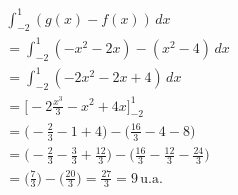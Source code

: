\begin{exercicio}
\begin{align*}
  &\int_{-2}^{1}(g(x)-f(x))\, dx\\
  &=\int_{-2}^{1}(-x^2-2x)-(x^2-4)\, dx\\
  &=\int_{-2}^{1}(-2x^2-2x+4)\, dx\\
  &=\Big[-2\frac{x^3}{3}-x^2+4x\Big]_{-2}^1\\
  &=\Big(-\frac{2}{3}-1+4\Big)-\Big(\frac{16}{3}-4-8\Big)\\
  &=\Big(-\frac{2}{3}-\frac{3}{3}+\frac{12}{3}\Big)-\Big(\frac{16}{3}-\frac{12}{3}-\frac{24}{3}\Big)\\
  &=\Big(\frac{7}{3}\Big)-\Big(\frac{20}{3}\Big)=\frac{27}{3}=\boxed{9\,\text{u.a.}}\\
\end{align*}
\end{exercicio}





